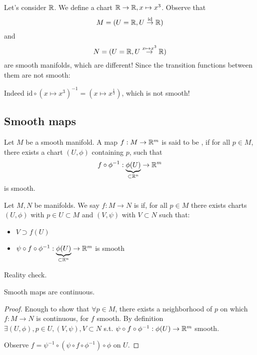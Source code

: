 \begin{example}[Example 7: ]
    Let's consider \(\mathbb{R}\). We define a chart \(\mathbb{R}\to\mathbb{R},x\mapsto x^3\). Observe that 
    \[M=(U=\mathbb{R},U\stackrel{\text{id}}{\to}\mathbb{R})\]
    and 
    \[N=(U=\mathbb{R},U\stackrel{x\mapsto x^3}{\to}\mathbb{R})\]
    are smooth manifolds, which are different! Since the transition functions between them are not smooth:

    Indeed \(\text{id}\circ (x\mapsto x^3)^{-1}=(x\mapsto x^{\frac{1}{3}})\), which is not smooth!
\end{example}

\subsection{Smooth maps}

\begin{definition*}
    Let \(M\) be a smooth manifold. A map \(f:M\to\mathbb{R}^m\) is said to be , if for all 
    \(p\in M\), there exists a chart \((U,\phi)\) containing \(p\), such that
    \[f\circ \phi^{-1}:\underbrace{\phi(U)}_{\subset\mathbb{R}^n}\to\mathbb{R}^m\] 
    is smooth. 
\end{definition*}

\begin{definition*}
    Let \(M,N\) be manifolds. We say \(f:M\to N\) is  if, for all \(p\in M\) 
    there exists charts \((U,\phi)\) with \(p\in U\subset M\) and \((V,\psi)\) with \(V\subset N\) such that: 
    \begin{itemize}
        \item \(V\supset f(U)\)
        \item \(\psi\circ f\circ \phi^{-1}:\underbrace{\phi(U)}_{\subset\mathbb{R}^n}\to\mathbb{R}^m\) is smooth
    \end{itemize}
\end{definition*}

Reality check.

\begin{lemma}\label{lem:2.1}
    Smooth maps are continuous.
\end{lemma}

\begin{proof}
    Enough to show that \(\forall p\in M\), there exists a neighborhood of \(p\) on which \(f:M\to N\) is 
    continuous, for \(f\) smooth. By definition \(\exists (U,\phi),p\in U,(V,\psi),V\subset N\) s.t. 
    \(\psi \circ f\circ \phi^{-1}:\phi(U)\to\mathbb{R}^m\) smooth.

    Observe \(f=\psi^{-1}\circ (\psi \circ f\circ \phi^{-1})\circ \phi\) on \(U\).
\end{proof}

